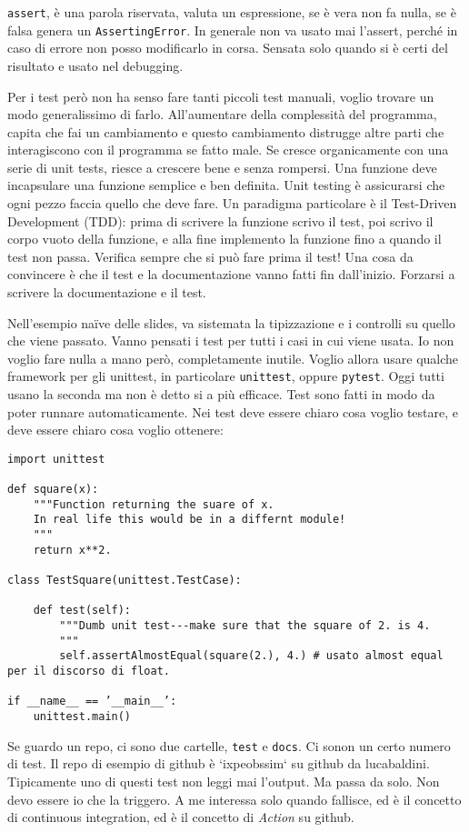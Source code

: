 \documentclass[10pt, a4paper, titlepage]{book}
\begin{document}
\texttt{assert}, è una parola riservata, valuta un espressione, se è vera non fa nulla, se è falsa genera un \texttt{AssertingError}. In generale non va usato mai l'assert, perché in caso di errore non posso modificarlo in corsa. Sensata solo quando si è certi del risultato e usato nel debugging.

Per i test però non ha senso fare tanti piccoli test manuali, voglio trovare un modo generalissimo di farlo. All'aumentare della complessità del programma, capita che fai un cambiamento e questo cambiamento distrugge altre parti che interagiscono con il programma se fatto male.
Se cresce organicamente con una serie di unit tests, riesce a crescere bene e senza rompersi.
Una funzione deve incapsulare una funzione semplice e ben definita. Unit testing è assicurarsi che ogni pezzo faccia quello che deve fare.
Un paradigma particolare è il Test-Driven Development (TDD): prima di scrivere la funzione scrivo il test, poi scrivo il corpo vuoto della funzione, e alla fine implemento la funzione fino a quando il test non passa. Verifica sempre che si può fare prima il test!
Una cosa da convincere è che il test e la documentazione vanno fatti fin dall'inizio.
Forzarsi a scrivere la documentazione e il test.

Nell'esempio naïve delle slides, va sistemata la tipizzazione e i controlli su quello che viene passato. Vanno pensati i test per tutti i casi in cui viene usata.
Io non voglio fare nulla a mano però, completamente inutile. Voglio allora usare qualche framework per gli unittest, in particolare \texttt{unittest}, oppure \texttt{pytest}. Oggi tutti usano la seconda ma non è detto si a più efficace.
Test sono fatti in modo da poter runnare automaticamente. Nei test deve essere chiaro cosa voglio testare, e deve essere chiaro cosa voglio ottenere:
\begin{verbatim}
import unittest

def square(x):
	"""Function returning the suare of x.
	In real life this would be in a differnt module!
	"""
	return x**2.

class TestSquare(unittest.TestCase):

	def test(self):
		"""Dumb unit test---make sure that the square of 2. is 4.
		"""
		self.assertAlmostEqual(square(2.), 4.) # usato almost equal per il discorso di float.

if __name__ == ’__main__’:
	unittest.main()	
\end{verbatim}

Se guardo un repo, ci sono due cartelle, \texttt{test} e \texttt{docs}. Ci sonon un certo numero di test. Il repo di esempio di github è `ixpeobssim` su github da lucabaldini.
Tipicamente uno di questi test non leggi mai l'output. Ma passa da solo. Non devo essere io che la triggero. A me interessa solo quando fallisce, ed è il concetto di continuous integration, ed è il concetto di \textit{Action} su github.
\end{document}
